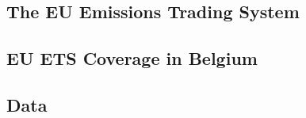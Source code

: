 
\subsection{The EU Emissions Trading System}\label{subsec:euets}

%


\subsection{EU ETS Coverage in Belgium}\label{subsec:coverage}



\subsection{Data}\label{subsec:data_sources}

